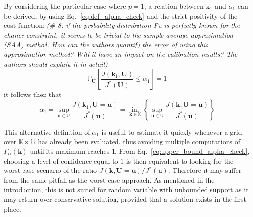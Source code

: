 \documentclass[preprint, review, 1p]{elsarticle}
\newcommand{\Prob}{\mathbb{P}}
\newcommand{\checka}{{\alpha}}
\newcommand{\checkk}{\mathbf{k}}
\newcommand{\checkkp}{{\mathbf{k}}_p}
\newcommand{\Kspace}{\mathbb{K}}
\newcommand{\Uspace}{\mathbb{U}}
\newcommand{\victor}[1]{{\itshape\color{green} ({#1})}}
\begin{document}


By considering the particular case where $p=1$, a relation between $\checkk_1$ and $\checka_1$ can be derived, by using Eq.~\eqref{eq:def_alpha_check} and the strict positivity of the cost function: \victor{\# 8: if the probability distribution Pu is perfectly known for the chance constraint, it seems to be trivial to the sample average approximation (SAA) method. How can the authors quantify the error of using this approximation method? Will it have an impact on the calibration results? The authors should explain it in detail}
\begin{equation}
  \label{eq:def_alpha1}
  \Prob_{\mathbf{U}}\left[\frac{J(\mathbf{k}_1,\mathbf{U})}{ J^*(\mathbf{U}) } \leq \checka_1\right]=1
\end{equation}
it follows then that 
\begin{equation}
  \label{eq:upper_bound_alpha_check}
  \checka_1 = \sup_{\mathbf{u}\in\Uspace} \frac{J(\mathbf{k}_1,\mathbf{U}=\mathbf{u})}{J^*(\mathbf{u})} =  \inf_{\mathbf{k}\in\Kspace} \left\{ \sup_{\mathbf{u}\in\Uspace} \frac{J(\mathbf{k},\mathbf{U}=\mathbf{u})}{J^*(\mathbf{u})} \right\} 
\end{equation}

This alternative definition of $\checka_1$ is useful to estimate it quickly whenever a grid over $\mathbb{K}\times\mathbb{U}$ has already been evaluated, thus avoiding multiple computations of $\Gamma_{\alpha}(\mathbf{k})$ until its maximum reaches $1$. From Eq.~\eqref{eq:upper_bound_alpha_check}, choosing a level of confidence equal to $1$ is then equivalent to looking for the worst-case scenario of the ratio ${J(\mathbf{k},\mathbf{U}=\mathbf{u})/J^*(\mathbf{u})}$. Therefore it may suffer from the same pitfall as the worst-case approach. As mentioned in the introduction, this is not suited for random variable with unbounded support as it may return over-conservative solution, provided that a solution exists in the first place.
\end{document}
